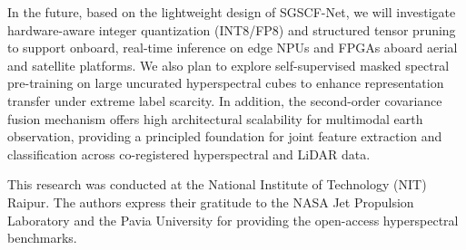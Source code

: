 \documentclass[manuscript,screen,review]{acmart}
\begin{document}
In the future, based on the lightweight design of SGSCF-Net, we will investigate hardware-aware integer quantization (INT8/FP8) and structured tensor pruning to support onboard, real-time inference on edge NPUs and FPGAs aboard aerial and satellite platforms. We also plan to explore self-supervised masked spectral pre-training on large uncurated hyperspectral cubes to enhance representation transfer under extreme label scarcity. In addition, the second-order covariance fusion mechanism offers high architectural scalability for multimodal earth observation, providing a principled foundation for joint feature extraction and classification across co-registered hyperspectral and LiDAR data.

\begin{acks}
This research was conducted at the National Institute of Technology (NIT) Raipur. The authors express their gratitude to the NASA Jet Propulsion Laboratory and the Pavia University for providing the open-access hyperspectral benchmarks.
\end{acks}



\end{document}
